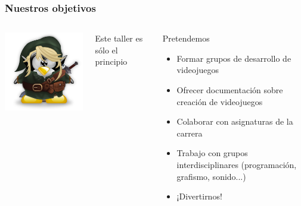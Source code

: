 	
\begin{frame}
	\frametitle{Nuestros objetivos}
	
	\begin{columns}[c]
		\column{75pt}
		\begin{center}
			\includegraphics[scale=0.3]{img/link.png}
		\end{center}
		\column{225pt}
		
		\begin{center}
			Este taller es sólo el principio
		\end{center}		
		
		\begin{block}{Pretendemos}
            \begin{itemize}
                \item Formar grupos de desarrollo de videojuegos
				\item Ofrecer documentación sobre creación de videojuegos
				\item Colaborar con asignaturas de la carrera
				\item Trabajo con grupos interdisciplinares (programación, grafismo, sonido...)
				\item ¡Divertirnos!
            \end{itemize}            
        \end{block}        
	\end{columns}
\end{frame}

